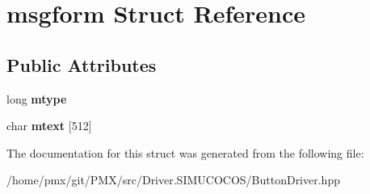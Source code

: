 \hypertarget{structmsgform}{}\section{msgform Struct Reference}
\label{structmsgform}
\subsection*{Public Attributes}
\begin{DoxyCompactItemize}
\item 
\mbox{\label{structmsgform_a58c7bc78ec771f070be4a3e1dba504b0}} 
long {\bfseries mtype}
\item 
\mbox{\label{structmsgform_a15fad8e8839b0c73523ad0b2d044d903}} 
char {\bfseries mtext} \mbox{[}512\mbox{]}
\end{DoxyCompactItemize}


The documentation for this struct was generated from the following file\+:\begin{DoxyCompactItemize}
\item 
/home/pmx/git/\+P\+M\+X/src/\+Driver.\+S\+I\+M\+U\+C\+O\+C\+O\+S/Button\+Driver.\+hpp\end{DoxyCompactItemize}

